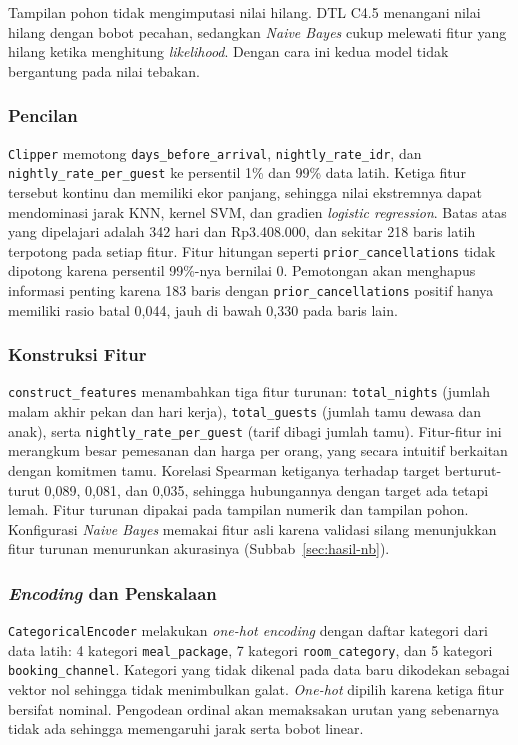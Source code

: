 Tampilan pohon tidak mengimputasi nilai hilang. DTL C4.5 menangani nilai hilang dengan bobot pecahan, sedangkan \textit{Naive Bayes} cukup melewati fitur yang hilang ketika menghitung \textit{likelihood}. Dengan cara ini kedua model tidak bergantung pada nilai tebakan.

\subsubsection{Pencilan}
\texttt{Clipper} memotong \texttt{days\_before\_arrival}, \texttt{nightly\_rate\_idr}, dan \texttt{nightly\_rate\_per\_guest} ke persentil 1\% dan 99\% data latih. Ketiga fitur tersebut kontinu dan memiliki ekor panjang, sehingga nilai ekstremnya dapat mendominasi jarak KNN, kernel SVM, dan gradien \textit{logistic regression}. Batas atas yang dipelajari adalah 342 hari dan Rp3.408.000, dan sekitar 218 baris latih terpotong pada setiap fitur. Fitur hitungan seperti \texttt{prior\_cancellations} tidak dipotong karena persentil 99\%-nya bernilai 0. Pemotongan akan menghapus informasi penting karena 183 baris dengan \texttt{prior\_cancellations} positif hanya memiliki rasio batal 0,044, jauh di bawah 0,330 pada baris lain.

\subsubsection{Konstruksi Fitur}
\texttt{construct\_features} menambahkan tiga fitur turunan: \texttt{total\_nights} (jumlah malam akhir pekan dan hari kerja), \texttt{total\_guests} (jumlah tamu dewasa dan anak), serta \texttt{nightly\_rate\_per\_guest} (tarif dibagi jumlah tamu). Fitur-fitur ini merangkum besar pemesanan dan harga per orang, yang secara intuitif berkaitan dengan komitmen tamu. Korelasi Spearman ketiganya terhadap target berturut-turut 0,089, 0,081, dan 0,035, sehingga hubungannya dengan target ada tetapi lemah. Fitur turunan dipakai pada tampilan numerik dan tampilan pohon. Konfigurasi \textit{Naive Bayes} memakai fitur asli karena validasi silang menunjukkan fitur turunan menurunkan akurasinya (Subbab~\ref{sec:hasil-nb}).

\subsubsection{\textit{Encoding} dan Penskalaan}
\texttt{CategoricalEncoder} melakukan \textit{one-hot encoding} dengan daftar kategori dari data latih: 4 kategori \texttt{meal\_package}, 7 kategori \texttt{room\_category}, dan 5 kategori \texttt{booking\_channel}. Kategori yang tidak dikenal pada data baru dikodekan sebagai vektor nol sehingga tidak menimbulkan galat. \textit{One-hot} dipilih karena ketiga fitur bersifat nominal. Pengodean ordinal akan memaksakan urutan yang sebenarnya tidak ada sehingga memengaruhi jarak serta bobot linear.

